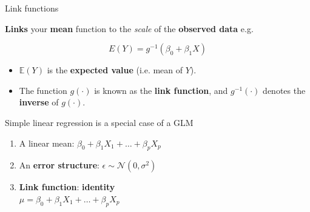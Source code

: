 \documentclass[pdf]{beamer}
\begin{document}
\begin{frame}{Link functions}

\textbf{Links} your \textbf{mean} function to the \textit{scale} of the \textbf{observed data} e.g.

$$
E(Y) = g^{-1}\left(\beta_0 + \beta_1 X\right)
$$

\vfill

\begin{itemize}\addtolength{\itemsep}{2\baselineskip}
    \item $\mathbb{E}(Y)$ is the \textbf{expected value} (i.e. mean of $Y$).
    \item The function $g(\cdot)$ is known as the \textbf{link function}, and $g^{-1}(\cdot)$ denotes the \textbf{inverse} of $g(\cdot)$.
\end{itemize}

\end{frame}

\begin{frame}{Simple linear regression is a special case of a GLM}

\begin{enumerate}\addtolength{\itemsep}{2\baselineskip}
    \item<1-> A linear mean: $\beta_0 + \beta_1X_1 + \ldots + \beta_pX_p$
    \item<2-> An \textbf{error structure}: $\epsilon \sim \mathcal{N}(0,\sigma^2)$
    \item<3-> \textbf{Link function}: \textbf{identity}\\
    $\mu = \beta_0 + \beta_1X_1 + \ldots + \beta_pX_p$
\end{enumerate}

\vfill 


\end{frame}
\end{document}
